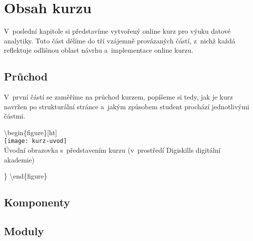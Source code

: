 \hypertarget{obsah-kurzu}{%
\chapter{Obsah kurzu}\label{obsah-kurzu}}

V~poslední kapitole si představíme vytvořený online kurz pro výuku datové analytiky. Tuto část dělíme do tří vzájemně provázaných částí, z~nichž každá reflektuje odlišnou oblast návrhu a~implementace online kurzu.

\hypertarget{prux16fchod}{%
\section{Průchod}\label{prux16fchod}}

V~první částí se zaměříme na průchod kurzem, popíšeme si tedy, jak je kurz navržen po strukturální stránce a~jakým způsobem student prochází jednotlivými částmi.

\textbackslash begin\{figure\}{[}ht{]}\\
\centering \texttt{[image: kurz-uvod]}\\

\caption{Úvodní obrazovka s~představením kurzu (v~prostředí Digiskills digitální akademie)}

\} \label{kurz-uvod} \textbackslash end\{figure\}

\hypertarget{komponenty}{%
\section{Komponenty}\label{komponenty}}

\hypertarget{moduly}{%
\section{Moduly}\label{moduly}}
